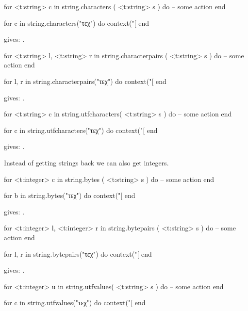 \starttyping[option=LUA]
for <t:string> c in string.characters ( <t:string> s ) do
    -- some action
end
\stoptyping

\startbuffer
\startluacode
for c in string.characters("τεχ") do
    context("[%
end
\stopluacode
\stopbuffer

\typebuffer

gives: \inlinebuffer.

\starttyping[option=LUA]
for <t:string> l, <t:string> r in string.characterpairs ( <t:string> s ) do
    -- some action
end
\stoptyping

\startbuffer
\startluacode
for l, r in string.characterpairs("τεχ") do
    context("[%
end
\stopluacode
\stopbuffer

\typebuffer

gives: \inlinebuffer.

\starttyping[option=LUA]
for <t:string> c in string.utfcharacters( <t:string> s ) do
    -- some action
end
\stoptyping

\startbuffer
\startluacode
for c in string.utfcharacters("τεχ") do
    context("[%
end
\stopluacode
\stopbuffer

\typebuffer

gives: \inlinebuffer.

Instead of getting strings back we can also get integers.

\starttyping[option=LUA]
for <t:integer> c in string.bytes ( <t:string> s ) do
    -- some action
end
\stoptyping

\startbuffer
\startluacode
for b in string.bytes("τεχ") do
    context("[%
end
\stopluacode
\stopbuffer

\typebuffer

gives: \inlinebuffer.

\starttyping[option=LUA]
for <t:integer> l, <t:integer> r in string.bytepairs ( <t:string> s ) do
    -- some action
end
\stoptyping

\startbuffer
\startluacode
for l, r in string.bytepairs("τεχ") do
    context("[%
end
\stopluacode
\stopbuffer

\typebuffer

gives: \inlinebuffer.

\starttyping[option=LUA]
for <t:integer> u in string.utfvalues( <t:string> s ) do
    -- some action
end
\stoptyping

\startbuffer
\startluacode
for c in string.utfvalues("τεχ") do
    context("[%
end
\stopluacode
\stopbuffer

